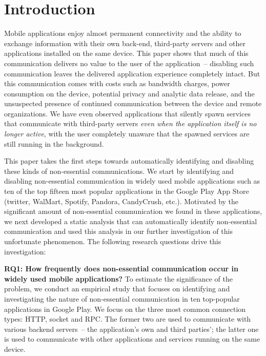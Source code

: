 \section{Introduction}
\label{sec:intro} 

Mobile applications enjoy almost permanent connectivity and the
ability to exchange information with their own back-end, third-party
servers and other applications installed on the same device.  This
paper shows that much of this communication delivers no value to the
user of the application~-- disabling such communication leaves the
delivered application experience completely intact.  But this
communication comes with costs such as bandwidth charges, power
consumption on the device, potential privacy and analytic data
release, and the unsuspected presence of continued communication
between the device and remote organizations. We have even observed
applications that silently spawn services that communicate with
third-party servers {\em even when the application itself is no longer
active}, with the user completely unaware that the spawned services are
still running in the background.

This paper takes the first steps towards automatically identifying and
disabling these kinds of non-essential communications. We start by
identifying and disabling non-essential communication in 
widely used mobile applications such as ten of the top fifteen most
popular applications in the Google Play App Store (twitter, WalMart,
Spotify, Pandora, CandyCrush, etc.). Motivated by the significant
amount of non-essential communication we found in these applications, 
we next developed a static analysis that can automatically identify 
non-essential communication and used this analysis in our
further investigation of this unfortunate phenomenon. The following
research questions drive this investigation:

\vspace{0.1in}
\noindent 
{\bf RQ1: How frequently does non-essential communication occur in
  widely used mobile applications?}  To estimate the significance of
the problem, we conduct an empirical study that focuses on identifying
and investigating the nature of non-essential communication in ten
top-popular applications in Google Play.  We focus on the three most
common connection types: HTTP, socket and RPC.  The former two are
used to communicate with various backend servers~-- the application's
own and third parties'; the latter one is used to communicate with
other applications and services running on the same device.

